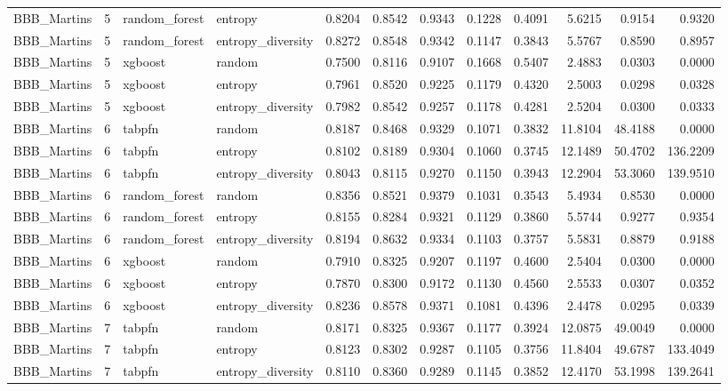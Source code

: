 \begin{tabular}{lrllrrrrrrrr}
BBB_Martins & 5 & random_forest & entropy & 0.8204 & 0.8542 & 0.9343 & 0.1228 & 0.4091 & 5.6215 & 0.9154 & 0.9320 \\
BBB_Martins & 5 & random_forest & entropy_diversity & 0.8272 & 0.8548 & 0.9342 & 0.1147 & 0.3843 & 5.5767 & 0.8590 & 0.8957 \\
BBB_Martins & 5 & xgboost & random & 0.7500 & 0.8116 & 0.9107 & 0.1668 & 0.5407 & 2.4883 & 0.0303 & 0.0000 \\
BBB_Martins & 5 & xgboost & entropy & 0.7961 & 0.8520 & 0.9225 & 0.1179 & 0.4320 & 2.5003 & 0.0298 & 0.0328 \\
BBB_Martins & 5 & xgboost & entropy_diversity & 0.7982 & 0.8542 & 0.9257 & 0.1178 & 0.4281 & 2.5204 & 0.0300 & 0.0333 \\
BBB_Martins & 6 & tabpfn & random & 0.8187 & 0.8468 & 0.9329 & 0.1071 & 0.3832 & 11.8104 & 48.4188 & 0.0000 \\
BBB_Martins & 6 & tabpfn & entropy & 0.8102 & 0.8189 & 0.9304 & 0.1060 & 0.3745 & 12.1489 & 50.4702 & 136.2209 \\
BBB_Martins & 6 & tabpfn & entropy_diversity & 0.8043 & 0.8115 & 0.9270 & 0.1150 & 0.3943 & 12.2904 & 53.3060 & 139.9510 \\
BBB_Martins & 6 & random_forest & random & 0.8356 & 0.8521 & 0.9379 & 0.1031 & 0.3543 & 5.4934 & 0.8530 & 0.0000 \\
BBB_Martins & 6 & random_forest & entropy & 0.8155 & 0.8284 & 0.9321 & 0.1129 & 0.3860 & 5.5744 & 0.9277 & 0.9354 \\
BBB_Martins & 6 & random_forest & entropy_diversity & 0.8194 & 0.8632 & 0.9334 & 0.1103 & 0.3757 & 5.5831 & 0.8879 & 0.9188 \\
BBB_Martins & 6 & xgboost & random & 0.7910 & 0.8325 & 0.9207 & 0.1197 & 0.4600 & 2.5404 & 0.0300 & 0.0000 \\
BBB_Martins & 6 & xgboost & entropy & 0.7870 & 0.8300 & 0.9172 & 0.1130 & 0.4560 & 2.5533 & 0.0307 & 0.0352 \\
BBB_Martins & 6 & xgboost & entropy_diversity & 0.8236 & 0.8578 & 0.9371 & 0.1081 & 0.4396 & 2.4478 & 0.0295 & 0.0339 \\
BBB_Martins & 7 & tabpfn & random & 0.8171 & 0.8325 & 0.9367 & 0.1177 & 0.3924 & 12.0875 & 49.0049 & 0.0000 \\
BBB_Martins & 7 & tabpfn & entropy & 0.8123 & 0.8302 & 0.9287 & 0.1105 & 0.3756 & 11.8404 & 49.6787 & 133.4049 \\
BBB_Martins & 7 & tabpfn & entropy_diversity & 0.8110 & 0.8360 & 0.9289 & 0.1145 & 0.3852 & 12.4170 & 53.1998 & 139.2641 \\

\end{tabular}

